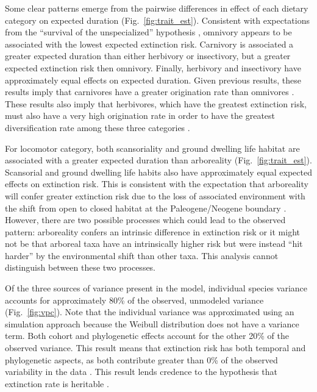 \documentclass{pnastwo}
\begin{document}
\begin{article}
Some clear patterns emerge from the pairwise differences in effect of each dietary category on expected duration (Fig.~\ref{fig:trait_est}). Consistent with expectations from the ``survival of the unspecialized'' hypothesis \cite{Liow2004a,Simpson1944}, omnivory appears to be associated with the lowest expected extinction risk. Carnivory is associated a greater expected duration than either herbivory or insectivory, but a greater expected extinction risk then omnivory. Finally, herbivory and insectivory have approximately equal effects on expected duration. Given previous results, these results imply that carnivores have a greater origination rate than omnivores \cite{Price2012}. These results also imply that herbivores, which have the greatest extinction risk, must also have a very high origination rate in order to have the greatest diversification rate among these three categories \cite{Price2012}. 

For locomotor category, both scansoriality and ground dwelling life habitat are associated with a greater expected duration than arboreality (Fig.~\ref{fig:trait_est}). Scansorial and ground dwelling life habits also have approximately equal expected effects on extinction risk.  This is consistent with the expectation that arboreality will confer greater extinction risk due to the loss of associated environment with the shift from open to closed habitat at the Paleogene/Neogene boundary \cite{Blois2009}. However, there are two possible processes which could lead to the observed pattern: arboreality confers an intrinsic difference in extinction risk or it might not be that arboreal taxa have an intrinsically higher risk but were instead ``hit harder'' by the environmental shift than other taxa. This analysis cannot distinguish between these two processes.

Of the three sources of variance present in the model, individual species variance accounts for approximately 80\% of the observed, unmodeled variance (Fig.~\ref{fig:vpc}). Note that the individual variance was approximated using an simulation approach \cite{Goldstein2002} because the Weibull distribution does not have a variance term. Both cohort and phylogenetic effects account for the other 20\% of the observed variance. This result means that extinction risk has both temporal and phylogenetic aspects, as both contribute greater than 0\% of the observed variability in the data \cite{Housworth2004}. This result lends credence to the hypothesis that extinction rate is heritable \cite{Rabosky2009e}.


\end{article}
\end{document}
